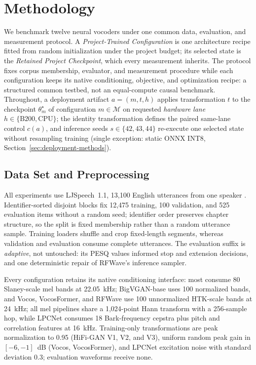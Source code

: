 \section{Methodology}
\label{sec:methodology}

We benchmark twelve neural vocoders under one common data, evaluation, and
measurement protocol.  A \emph{Project-Trained Configuration} is one architecture recipe
fitted from random initialization under the project budget; its selected
state is the \emph{Retained Project Checkpoint}, which every measurement
inherits.  The protocol fixes corpus membership, evaluator, and measurement
procedure while each configuration keeps its native conditioning, objective,
and optimization recipe: a structured common testbed, not an equal-compute
causal benchmark.  Throughout, a deployment artifact $a=(m,t,h)$ applies
transformation $t$ to the checkpoint $\theta_m^\star$ of configuration
$m\in\mathcal M$ on requested \emph{hardware lane}
$h\in\{\mathrm{B200},\mathrm{CPU}\}$; the
identity transformation defines the paired same-lane control $c(a)$, and
inference seeds $s\in\{42,43,44\}$ re-execute one selected state without
resampling training (single exception: static ONNX INT8,
Section~\ref{sec:deployment-methods}).

\subsection{Data Set and Preprocessing}
\label{sec:data-preprocessing}

All experiments use LJSpeech~1.1, 13,100 English utterances from one speaker
\citep{ito2017ljspeech}.  Identifier-sorted disjoint blocks fix 12,475
training, 100 validation, and 525 evaluation items without a random seed;
identifier order preserves chapter structure, so the split is fixed
membership rather than a random utterance sample.
Training loaders shuffle and crop fixed-length segments,
whereas validation and evaluation consume complete utterances.  The
evaluation suffix is \emph{adaptive}, not untouched: its PESQ values informed
stop and extension decisions, and one deterministic repair of RFWave's
inference sampler.

Every configuration retains its native conditioning interface: most consume
80 Slaney-scale mel bands at 22.05~kHz; BigVGAN-base uses 100 normalized
bands, and Vocos, VocosFormer, and RFWave use 100 unnormalized HTK-scale
bands at 24~kHz; all mel pipelines share a 1,024-point Hann transform with
a 256-sample hop, while LPCNet consumes 18 Bark-frequency cepstra plus pitch and
correlation features at 16~kHz.  Training-only transformations are peak
normalization to 0.95 (HiFi-GAN V1, V2, and V3), uniform random peak gain in
$[-6,-1]$~dB (Vocos, VocosFormer), and LPCNet excitation noise with standard
deviation 0.3; evaluation waveforms receive none.

